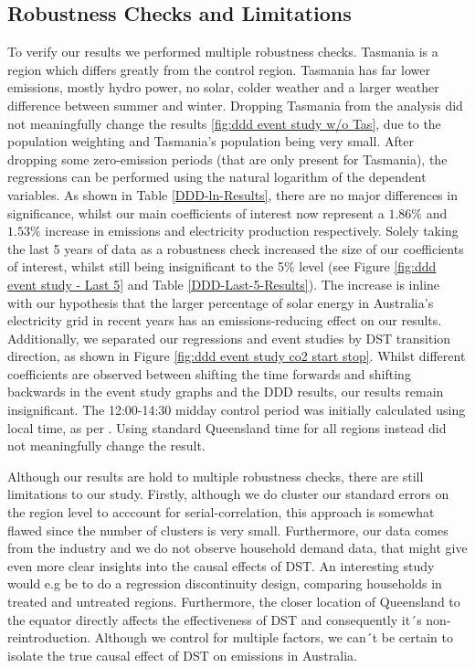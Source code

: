 \subsection{Robustness Checks and Limitations}

To verify our results we performed multiple robustness checks. 
Tasmania is a region which differs greatly from the control region. Tasmania has far lower emissions, mostly hydro power, no solar, colder weather and a larger weather difference between summer and winter. Dropping Tasmania from the analysis did not meaningfully change the results \ref{fig:ddd event study w/o Tas}, due to the population weighting and Tasmania's population being very small.
After dropping some zero-emission periods (that are only present for Tasmania), the regressions can be performed using the natural logarithm of the dependent variables. As shown in Table \ref{DDD-ln-Results}, there are no major differences in significance, whilst our main coefficients of interest now represent a $1.86\%$ and $1.53\%$ increase in emissions and electricity production respectively. Solely taking the last 5 years of data as a robustness check increased the size of our coefficients of interest, whilst still being insignificant to the 5\% level (see Figure \ref{fig:ddd event study - Last 5} and Table \ref{DDD-Last-5-Results}). The increase is inline with our hypothesis that the larger percentage of solar energy in Australia's electricity grid in recent years has an emissions-reducing effect on our results. Additionally, we separated our regressions and event studies by DST transition direction, as shown in Figure \ref{fig:ddd event study co2 start stop}. Whilst different coefficients are observed between shifting the time forwards and shifting backwards in the event study graphs and the \ac{DDD} results, our results remain insignificant.
The 12:00-14:30 midday control period was initially calculated using local time, as per \cite{kellogg_daylight_2008}. Using standard Queensland time for all regions instead did not meaningfully change the result.

Although our results are hold to multiple robustness checks, there are still limitations to our study. Firstly, although we do cluster our standard errors on the region level to acccount for serial-correlation, this approach is somewhat flawed since the number of clusters is very small. 
Furthermore, our data comes from the industry and we do not observe household demand data, that might give even more clear insights into the causal effects of \ac{DST}. An interesting study would e.g be to do a regression discontinuity design, comparing households in treated and untreated regions. Furthermore, the closer location of Queensland to the equator directly affects the effectiveness of \ac{DST} and consequently it´s non-reintroduction. Although we control for multiple factors, we can´t be certain to isolate the true causal effect of \ac{DST} on emissions in Australia. 